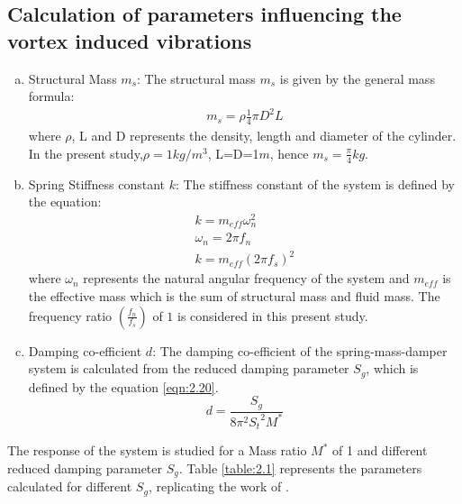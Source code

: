 \subsection{Calculation of parameters influencing the vortex induced vibrations}
\begin{enumerate}[(a)]
\item Structural Mass $m_{s}$: The structural mass $m_{s}$ is given by the general mass formula:\\
  \begin{align}
  {m_{s}} =  \rho\frac{1}{4}\pi{D^{2}}{L}
  \end{align}
  where $\rho$, L and D represents the density, length and diameter of the cylinder. In the present study,$\rho=1kg/m^{3}$, L=D=1$m$, hence $m_s=\frac{\pi}{4} kg$.
\item Spring Stiffness constant $k$: The stiffness constant of the system is defined by the equation:\\
 \begin{align}
 {k} = {m_{eff}}{\omega}_{n}^{2}\\
 \omega_{n} = 2{\pi}{f_{n}}\\
 {k} = {m_{eff}}\left(2\pi{f_{s}}\right)^2
 \end{align}
where $\omega_{n}$ represents the natural angular frequency of the system and $m_{eff}$ is the effective mass which is the sum of structural mass and fluid mass. The frequency ratio $\left(\frac{f_{n}}{f_{s}}\right)$ of $1$ is considered in this present study.
\item Damping co-efficient $d$: The damping co-efficient of the spring-mass-damper system is calculated from the reduced damping parameter $S_{g}$, which is defined by the equation \ref{eqn:2.20}.\\
 \begin{equation}\label{eqn:2.20}
 {d} = \frac{S_{g}}{8{\pi}^2{S_{t}}^2{M}^*}
 \end{equation}   
\end{enumerate}

The response of the system is studied for a Mass ratio $M^*$ of 1 and different reduced damping parameter $S_{g}$. Table \ref{table:2.1} represents the parameters calculated for different $S_{g}$, replicating the work of \citet{zhou1999vortex}.\\


